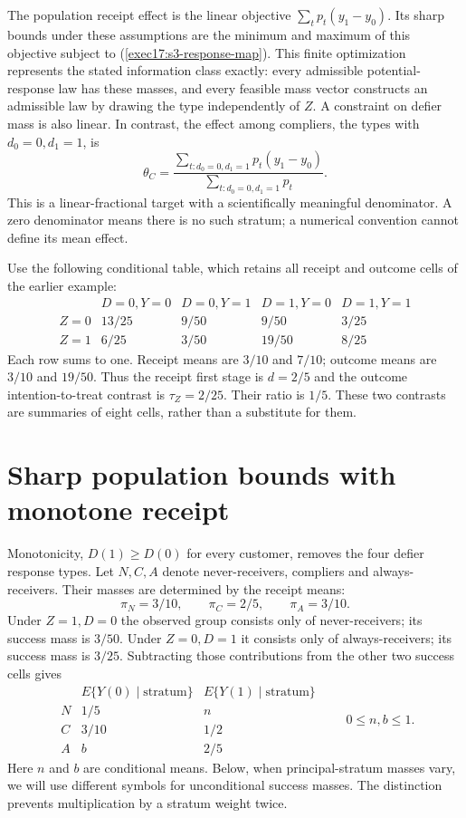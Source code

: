 The population receipt effect is the linear objective
$\sum_t p_t(y_1-y_0)$. Its sharp bounds under these assumptions are the
minimum and maximum of this objective subject to
(\ref{exec17:s3-response-map}). This finite optimization represents the
stated information class exactly: every admissible potential-response law
has these masses, and every feasible mass vector constructs an admissible
law by drawing the type independently of $Z$. A constraint on defier mass
is also linear. In contrast, the effect among compliers, the types with
$d_0=0,d_1=1$, is
\[
 \theta_C=
 \frac{\sum_{t:d_0=0,d_1=1}p_t(y_1-y_0)}
      {\sum_{t:d_0=0,d_1=1}p_t}.
\]
This is a linear-fractional target with a scientifically meaningful
denominator. A zero denominator means there is no such stratum; a
numerical convention cannot define its mean effect.

Use the following conditional table, which retains all receipt and outcome
cells of the earlier example:
\[
\begin{array}{c|rrrr}
 &D=0,Y=0&D=0,Y=1&D=1,Y=0&D=1,Y=1\\ \hline
 Z=0&13/25&9/50&9/50&3/25\\
 Z=1&6/25&3/50&19/50&8/25
\end{array}
\]
Each row sums to one. Receipt means are $3/10$ and $7/10$; outcome
means are $3/10$ and $19/50$. Thus the receipt first stage is
$d=2/5$ and the outcome intention-to-treat contrast is
$\tau_Z=2/25$. Their ratio is $1/5$. These two contrasts are summaries
of eight cells, rather than a substitute for them.

\section{Sharp population bounds with monotone receipt}
\label{exec17:s3-monotone-polytope}

Monotonicity, $D(1)\geq D(0)$ for every customer, removes the four
defier response types. Let $N,C,A$ denote never-receivers, compliers and
always-receivers. Their masses are determined by the receipt means:
\[
 \pi_N=3/10,\qquad \pi_C=2/5,\qquad \pi_A=3/10.
\]
Under $Z=1,D=0$ the observed group consists only of never-receivers;
its success mass is $3/50$. Under $Z=0,D=1$ it consists only of
always-receivers; its success mass is $3/25$. Subtracting those
contributions from the other two success cells gives
\[
\begin{array}{c|cc}
 &E\{Y(0)\mid\text{stratum}\}&E\{Y(1)\mid\text{stratum}\}\\ \hline
 N&1/5&n\\
 C&3/10&1/2\\
 A&b&2/5
\end{array}
\qquad 0\leq n,b\leq1 .
\]
Here $n$ and $b$ are conditional means. Below, when principal-stratum
masses vary, we will use different symbols for unconditional success
masses. The distinction prevents multiplication by a stratum weight twice.

